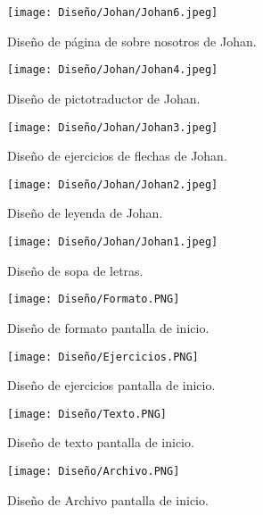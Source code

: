 \begin{figure}[ht!]
  \centering
  \texttt{[image: Diseño/Johan/Johan6.jpeg]}
  \caption{Diseño de página de sobre nosotros de Johan.}
  \label{Johan6}
\end{figure}

\begin{figure}[ht!]
  \centering
  \texttt{[image: Diseño/Johan/Johan4.jpeg]}
  \caption{Diseño de pictotraductor de Johan.}
  \label{Johan4}
\end{figure}

\begin{figure}[ht!]
  \centering
  \texttt{[image: Diseño/Johan/Johan3.jpeg]}
  \caption{Diseño de ejercicios de flechas de Johan.}
  \label{Johan3}
\end{figure}

\begin{figure}[ht!]
  \centering

  \texttt{[image: Diseño/Johan/Johan2.jpeg]}
  \caption{Diseño de leyenda de Johan.}
  \label{Johan2}
\end{figure}

\begin{figure}[ht!]
  \centering
  \texttt{[image: Diseño/Johan/Johan1.jpeg]}
  \caption{Diseño de sopa de letras.}

  \label{Johan1}
\end{figure}

\begin{figure}[ht!]
  \centering
  \texttt{[image: Diseño/Formato.PNG]}
  \caption{Diseño de formato pantalla de inicio.}
  \label{Forato}
\end{figure}


\begin{figure}[ht!]
  \centering
  \texttt{[image: Diseño/Ejercicios.PNG]}
  \caption{Diseño de ejercicios pantalla de inicio.}
  \label{ejercicios}
\end{figure}


\begin{figure}[ht!]
  \centering
  \texttt{[image: Diseño/Texto.PNG]}
  \caption{Diseño de texto pantalla de inicio.}
  \label{texto}
\end{figure}


\begin{figure}[ht!]
  \centering
  \texttt{[image: Diseño/Archivo.PNG]}
  \caption{Diseño de Archivo pantalla de inicio.}
  \label{archivo}
\end{figure}


